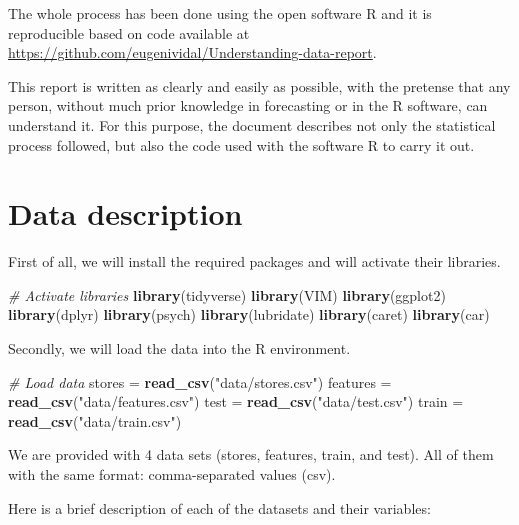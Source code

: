 \documentclass[11pt,]{article}
\newenvironment{Shaded}{\begin{snugshade}}{\end{snugshade}}
\newcommand{\KeywordTok}[1]{\textcolor[rgb]{0.13,0.29,0.53}{\textbf{{#1}}}}
\newcommand{\StringTok}[1]{\textcolor[rgb]{0.31,0.60,0.02}{{#1}}}
\newcommand{\CommentTok}[1]{\textcolor[rgb]{0.56,0.35,0.01}{\textit{{#1}}}}
\newcommand{\NormalTok}[1]{{#1}}
\begin{document}
The whole process has been done using the open software R and it is
reproducible based on code available at
\url{https://github.com/eugenividal/Understanding-data-report}.

This report is written as clearly and easily as possible, with the
pretense that any person, without much prior knowledge in forecasting or
in the R software, can understand it. For this purpose, the document
describes not only the statistical process followed, but also the code
used with the software R to carry it out.

\section{Data description}\label{data-description}

First of all, we will install the required packages and will activate
their libraries.

\begin{Shaded}
\begin{Highlighting}[]
\CommentTok{# Activate libraries}
\KeywordTok{library}\NormalTok{(tidyverse)}
\KeywordTok{library}\NormalTok{(VIM)}
\KeywordTok{library}\NormalTok{(ggplot2)}
\KeywordTok{library}\NormalTok{(dplyr)}
\KeywordTok{library}\NormalTok{(psych)}
\KeywordTok{library}\NormalTok{(lubridate)}
\KeywordTok{library}\NormalTok{(caret)}
\KeywordTok{library}\NormalTok{(car)}
\end{Highlighting}
\end{Shaded}

Secondly, we will load the data into the R environment.

\begin{Shaded}
\begin{Highlighting}[]
\CommentTok{# Load data}
\NormalTok{stores =}\StringTok{ }\KeywordTok{read_csv}\NormalTok{(}\StringTok{"data/stores.csv"}\NormalTok{)}
\NormalTok{features =}\StringTok{ }\KeywordTok{read_csv}\NormalTok{(}\StringTok{"data/features.csv"}\NormalTok{)}
\NormalTok{test =}\StringTok{ }\KeywordTok{read_csv}\NormalTok{(}\StringTok{"data/test.csv"}\NormalTok{)}
\NormalTok{train =}\StringTok{ }\KeywordTok{read_csv}\NormalTok{(}\StringTok{"data/train.csv"}\NormalTok{)}
\end{Highlighting}
\end{Shaded}

We are provided with 4 data sets (stores, features, train, and test).
All of them with the same format: comma-separated values (csv).

Here is a brief description of each of the datasets and their variables:
\end{document}

